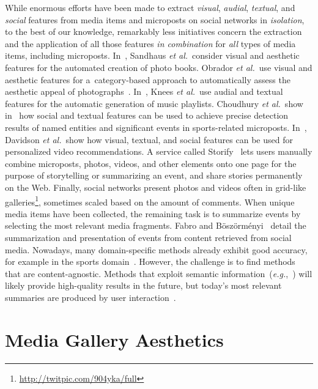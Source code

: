 While enormous efforts have been made to extract
\emph{visual}, \emph{audial},
\emph{textual}, and \emph{social} features
from media items and microposts on social networks in \emph{isolation},
to the best of our knowledge, remarkably less initiatives 
concern the extraction and the application
of all those features \emph{in combination}
for \emph{all} types of media items, including microposts.
In~\cite{sandhaus2011photobook}, Sandhaus \emph{et al.}\ consider visual and
aesthetic features for the automated creation of photo books.
Obrador \emph{et al.}\ use visual and aesthetic features
for a~category-based approach to automatically assess
the aesthetic appeal of photographs~\cite{obrador2012photoaesthetics}.
In~\cite{knees2006musicplaylist}, Knees \emph{et al.}\ use audial and textual
features for the automatic generation of music playlists.
Choudhury \emph{et al.}\ show in~\cite{choudhury2011sportstweets} how social and textual
features can be used to achieve precise detection results 
of named entities and significant events in sports-related microposts.
In~\cite{davidson2010videorecommendation}, Davidson \emph{et al.}\ show how visual,
textual, and social features can be used for personalized video recommendations.
A service called Storify~\cite{fincham2011storify} lets users manually combine
microposts, photos, videos, and other elements onto one page for the purpose
of storytelling or summarizing an event,
and share stories permanently on the Web.
Finally, social networks present photos and videos
often in grid-like galleries\footnote{\url{http://twitpic.com/904yka/full}},
sometimes scaled based on the amount of comments.
When unique media items have been collected,
the remaining task is to summarize events by selecting the most relevant media fragments. 
Fabro and B\"osz\"orm\'enyi~\cite{delfabro2012summarization} detail
the summarization and presentation of events from content retrieved from social media.
Nowadays, many domain-specific methods already exhibit good accuracy,
for example in the sports domain~\cite{li2001sportsvideo,li2010americanfootball}. However, the challenge is to find methods that are content-agnostic.
Methods that exploit semantic information~(\emph{e.g.},~\cite{chen2009videosummarization}) 
will likely provide high-quality results in the future,
but today's most relevant summaries are produced by user interaction~\cite{olsen2011videosummarization}.

\section{Media Gallery Aesthetics}

